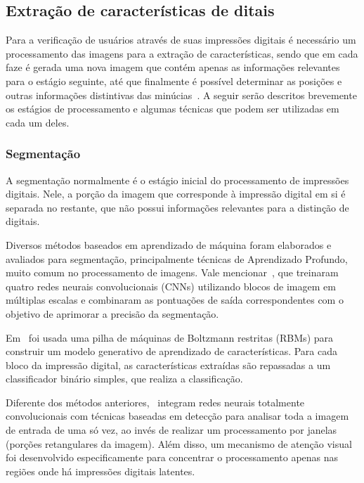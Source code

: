 \subsection{Extração de características de ditais}\label{subsec:extracao_de_caracteristicas}

Para a verificação de usuários através de suas impressões digitais é necessário um processamento das imagens para a extração de características, sendo que em cada faze é gerada uma nova imagem que contém apenas as informações relevantes para o estágio seguinte, até que finalmente é possível determinar as posições e outras informações distintivas das minúcias~\cite{Maltoni20221}. A seguir serão descritos brevemente os estágios de processamento e algumas técnicas que podem ser utilizadas em cada um deles.

\subsubsection{Segmentação}\label{subsubsec:segmentacao}

A segmentação normalmente é o estágio inicial do processamento de impressões digitais. Nele, a porção da imagem que corresponde à impressão digital em si é separada no restante, que não possui informações relevantes para a distinção de digitais. 

Diversos métodos baseados em aprendizado de máquina foram elaborados e avaliados para segmentação, principalmente técnicas de Aprendizado Profundo, muito comum no processamento de imagens. Vale mencionar~, que treinaram quatro redes neurais convolucionais (CNNs) utilizando blocos de imagem em múltiplas escalas e combinaram as pontuações de saída correspondentes com o objetivo de aprimorar a precisão da segmentação.

Em~\cite{Ezeobiejesi2017} foi usada uma pilha de máquinas de Boltzmann restritas (RBMs) para construir um modelo generativo de aprendizado de características. Para cada bloco da impressão digital, as características extraídas são repassadas a um classificador binário simples, que realiza a classificação.

Diferente dos métodos anteriores,~ integram redes neurais totalmente convolucionais com técnicas baseadas em detecção para analisar toda a imagem de entrada de uma só vez, ao invés de realizar um processamento por janelas (porções retangulares da imagem). Além disso, um mecanismo de atenção visual foi desenvolvido especificamente para concentrar o processamento apenas nas regiões onde há impressões digitais latentes.

